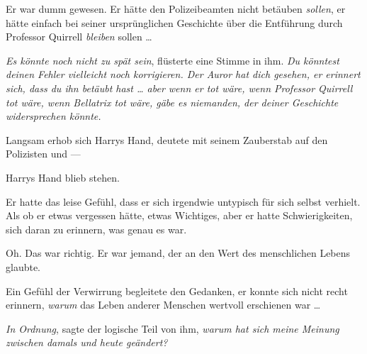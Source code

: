 Er war dumm gewesen. Er hätte den Polizeibeamten nicht betäuben \emph{sollen}, er hätte einfach bei seiner ursprünglichen Geschichte über die Entführung durch Professor Quirrell \emph{bleiben} sollen …

\emph{Es könnte noch nicht zu spät sein}, flüsterte eine Stimme in ihm. \emph{Du könntest deinen Fehler vielleicht noch korrigieren. Der Auror hat dich gesehen, er erinnert sich, dass du ihn betäubt hast … aber wenn er tot wäre, wenn Professor Quirrell tot wäre, wenn Bellatrix tot wäre, gäbe es niemanden, der deiner Geschichte widersprechen könnte.}

Langsam erhob sich Harrys Hand, deutete mit seinem Zauberstab auf den Polizisten und —

Harrys Hand blieb stehen.

Er hatte das leise Gefühl, dass er sich irgendwie untypisch für sich selbst verhielt. Als ob er etwas vergessen hätte, etwas Wichtiges, aber er hatte Schwierigkeiten, sich daran zu erinnern, was genau es war.

Oh. Das war richtig. Er war jemand, der an den Wert des menschlichen Lebens glaubte.

Ein Gefühl der Verwirrung begleitete den Gedanken, er konnte sich nicht recht erinnern, \emph{warum} das Leben anderer Menschen wertvoll erschienen war …

\emph{In Ordnung}, sagte der logische Teil von ihm, \emph{warum hat sich meine Meinung zwischen damals und heute geändert?}

